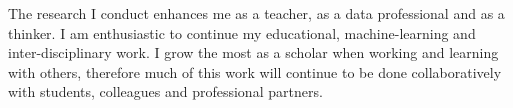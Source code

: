 \documentclass[letterpaper,12pt]{article}\usepackage[]{graphicx}\usepackage[]{color}
\begin{document}
The research I conduct enhances me as a teacher, as a data professional and as a thinker. I am enthusiastic to continue my educational, machine-learning and inter-disciplinary work. I grow the most as a scholar when working and learning with others, therefore much of this work will continue to be done collaboratively with students, colleagues and professional partners. 

\newpage



\end{document}
